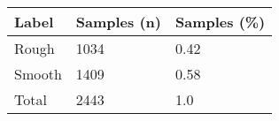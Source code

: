 \begin{tabular}{lll}
\toprule
Label & Samples (n) & Samples (\%) \\
\midrule
Rough  &        1034 &        0.42 \\
Smooth &        1409 &        0.58 \\
Total  &        2443 &         1.0 \\
\bottomrule
\end{tabular}
